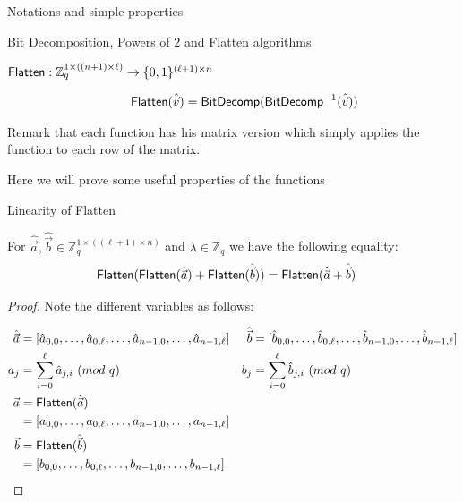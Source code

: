 \begin{section}{Notations and simple properties}
\begin{definition}{Bit Decomposition, Powers of $2$ and Flatten algorithms}
\begin{description}
    \item[${\mathsf{Flatten}}: \mathbb{Z}_q^{1 \times ((n + 1) \times \ell)} \to \{0,1\}^{(\ell+1) \times n}$]
      \begin{align*}
        {\mathsf{Flatten}}(\hat{\vec{v}}) &= {\mathsf{BitDecomp}}( {\mathsf{BitDecomp}}^{-1}(\hat{\vec{v}}))
      \end{align*}      
      
    \end{description}
    

    Remark that each function has his matrix version which simply applies the function to each row of the matrix.
  \end{definition}


  Here we will prove some useful properties of the functions 

  \begin{lemma}{Linearity of Flatten}
    
    For $\hat{\vec{a}}, \hat{\vec{b}} \in \mathbb{Z}_q^{1 \times ((\ell+1) \times n)}$ and $\lambda \in \mathbb{Z}_q$ we have the following equality:
    \begin{align*}
      {\mathsf{Flatten}}({\mathsf{Flatten}}(\hat{\vec{a}}) + {\mathsf{Flatten}}(\hat{\vec{b}})) &= {\mathsf{Flatten}}(\hat{\vec{a}}+ \hat{\vec{b}})
    \end{align*}
    
  \end{lemma}

  \begin{proof}
    
    Note the different variables as follows:

    \begin{align*}
      \hat{\vec{a}} &= [\hat{a}_{0,0}, \dots, \hat{a}_{0, \ell}, \dots, \hat{a}_{n-1, 0}, \dots, \hat{a}_{n-1, \ell}] & \hat{\vec{b}} &= [\hat{b}_{0,0}, \dots, \hat{b}_{0, \ell}, \dots, \hat{b}_{n-1, 0}, \dots, \hat{b}_{n-1, \ell}]\\
      a_{j} &= \sum_{i = 0}^{\ell}\hat{a}_{j, i}~(mod~q) & b_{j} &= \sum_{i = 0}^{\ell} \hat{b}_{j, i}~(mod~q)\\
      \vec{a} &= {\mathsf{Flatten}}(\hat{\vec{a}})\\
                    &= [a_{0,0}, \dots, a_{0, \ell}, \dots, a_{n-1, 0}, \dots, a_{n-1, \ell}]\\
      \vec{b} &= {\mathsf{Flatten}}(\hat{\vec{b}})\\
                    &= [b_{0,0}, \dots, b_{0, \ell}, \dots, b_{n-1, 0}, \dots, b_{n-1, \ell}]
    \end{align*}


\end{proof}
\end{section}
